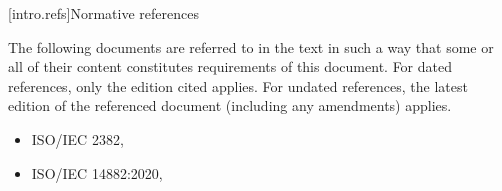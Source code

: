 
[intro.refs]{Normative references}%
%

\pnum
{}%
The following documents are referred to in the text in such a way that some or
all of their content constitutes requirements of this document. For dated
references, only the edition cited applies. For undated references, the latest
edition of the referenced document (including any amendments) applies.

\begin{itemize}


\item ISO/IEC 2382, 
\item ISO/IEC 14882:2020, 


\end{itemize}
